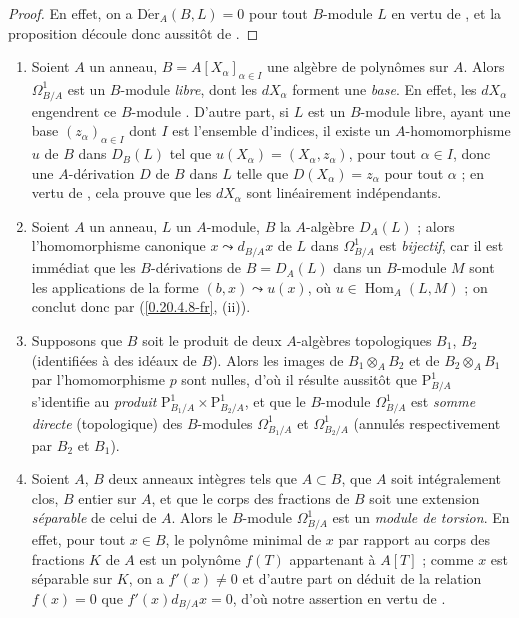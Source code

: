 \begin{proof}
En effet, on a $\operatorname{D\acute{e}r}_A(B,L)=0$ pour tout $B$-module
$L$ en vertu de , et la proposition découle donc aussitôt
de .
\end{proof}

\begin{examples}[20.4.13]
\label{0.20.4.13-fr}
\begin{enumerate}
  \item[\rm(i)] Soient $A$ un anneau,
  $B=A[X_\alpha]_{\alpha\in I}$ une algèbre de polynômes sur $A$. Alors
  $\Omega^1_{B/A}$ est un $B$-module \emph{libre}, dont les $dX_\alpha$ forment une
  \emph{base}. En effet, les $dX_\alpha$ engendrent ce $B$-module
  . D'autre part, si $L$ est un $B$-module libre, ayant
  une base $(z_\alpha)_{\alpha\in I}$ dont $I$ est l'ensemble d'indices, il
  existe un $A$-homomorphisme $u$ de $B$ dans $D_B(L)$ tel que
  $u(X_\alpha)=(X_\alpha,z_\alpha)$, pour tout $\alpha\in I$, donc
   une $A$-dérivation $D$ de $B$ dans $L$ telle que
  $D(X_\alpha)=z_\alpha$ pour tout $\alpha$ ; en vertu de
  , cela prouve que les $dX_\alpha$ sont linéairement
  indépendants.
  \item[\rm(ii)] Soient $A$ un anneau, $L$ un $A$-module, $B$ la
  $A$-algèbre $D_A(L)$ ; alors l'homomorphisme canonique
  $x\leadsto d_{B/A}x$ de $L$ dans $\Omega^1_{B/A}$ est \emph{bijectif}, car
  il est immédiat que les $B$-dérivations de $B=D_A(L)$ dans un $B$-module
  $M$ sont les applications de la forme $(b,x)\leadsto u(x)$, où
  $u\in\operatorname{Hom}_A(L,M)$ ; on conclut donc par
  (\ref{0.20.4.8-fr}, (ii)).
  \item[\rm(iii)] Supposons que $B$ soit le produit de deux $A$-algèbres
  topologiques $B_1$, $B_2$ (identifiées à des idéaux de $B$). Alors les
  images de $B_1\otimes_A B_2$ et de $B_2\otimes_A B_1$ par l'homomorphisme
  $p$  sont nulles, d'où il résulte aussitôt que
  $\mathrm{P}^1_{B/A}$ s'identifie au \emph{produit}
  $\mathrm{P}^1_{B_1/A}\times\mathrm{P}^1_{B_2/A}$, et que le $B$-module
  $\Omega^1_{B/A}$ est \emph{somme directe} (topologique) des $B$-modules
  $\Omega^1_{B_1/A}$ et $\Omega^1_{B_2/A}$ (annulés respectivement par
  $B_2$ et $B_1$).
  \item[\rm(iv)] Soient $A$, $B$ deux anneaux intègres tels que $A\subset
  B$, que $A$ soit intégralement clos, $B$ entier sur $A$, et que le corps
  des fractions de $B$ soit une extension \emph{séparable} de celui de $A$. Alors
  le $B$-module $\Omega^1_{B/A}$ est un \emph{module de torsion}. En effet,
  pour tout $x\in B$, le polynôme minimal de $x$ par rapport au corps des
  fractions $K$ de $A$ est un polynôme $f(T)$ appartenant à $A[T]$ ; comme
  $x$ est séparable sur $K$, on a $f'(x)\neq0$ et d'autre part on déduit de
  la relation $f(x)=0$ que $f'(x)d_{B/A}x=0$, d'où notre assertion en vertu
  de .
\end{enumerate}
\end{examples}

